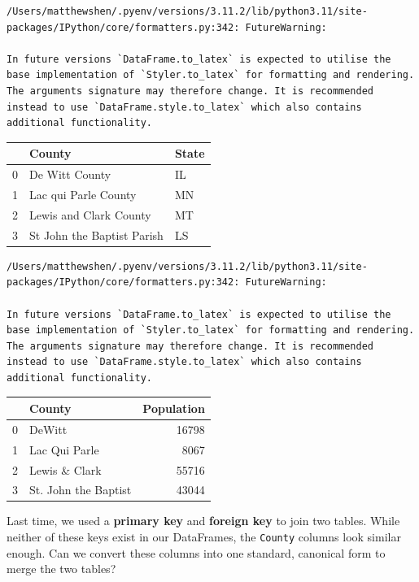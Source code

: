 \documentclass[
  letterpaper,
  DIV=11,
  numbers=noendperiod]{scrreprt}
\begin{document}
\begin{verbatim}
/Users/matthewshen/.pyenv/versions/3.11.2/lib/python3.11/site-packages/IPython/core/formatters.py:342: FutureWarning:

In future versions `DataFrame.to_latex` is expected to utilise the base implementation of `Styler.to_latex` for formatting and rendering. The arguments signature may therefore change. It is recommended instead to use `DataFrame.style.to_latex` which also contains additional functionality.
\end{verbatim}

\begin{tabular}{lll}
\toprule
{} &                      County & State \\
\midrule
0 &              De Witt County &    IL \\
1 &        Lac qui Parle County &    MN \\
2 &      Lewis and Clark County &    MT \\
3 &  St John the Baptist Parish &    LS \\
\bottomrule
\end{tabular}

\begin{verbatim}
/Users/matthewshen/.pyenv/versions/3.11.2/lib/python3.11/site-packages/IPython/core/formatters.py:342: FutureWarning:

In future versions `DataFrame.to_latex` is expected to utilise the base implementation of `Styler.to_latex` for formatting and rendering. The arguments signature may therefore change. It is recommended instead to use `DataFrame.style.to_latex` which also contains additional functionality.
\end{verbatim}

\begin{tabular}{llr}
\toprule
{} &                County &  Population \\
\midrule
0 &                DeWitt &       16798 \\
1 &         Lac Qui Parle &        8067 \\
2 &         Lewis \& Clark &       55716 \\
3 &  St. John the Baptist &       43044 \\
\bottomrule
\end{tabular}

Last time, we used a \textbf{primary key} and \textbf{foreign key} to
join two tables. While neither of these keys exist in our DataFrames,
the \texttt{County} columns look similar enough. Can we convert these
columns into one standard, canonical form to merge the two tables?
\end{document}
